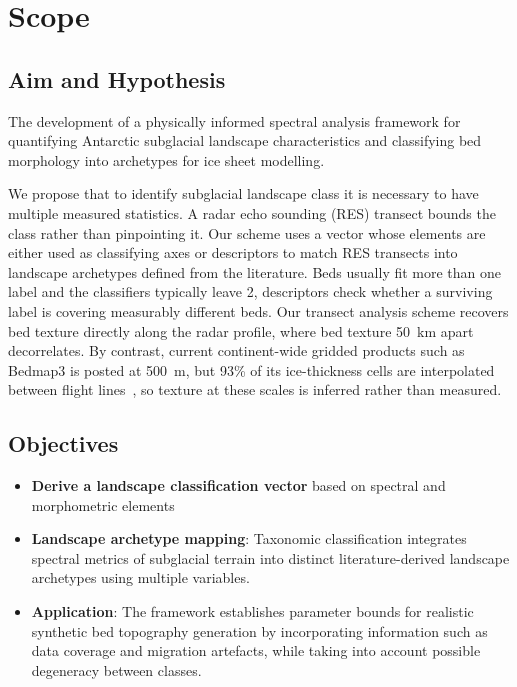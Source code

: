 \chapter{Scope}
\section{Aim and Hypothesis}
The development of a physically informed spectral analysis framework for quantifying Antarctic subglacial landscape characteristics and classifying bed morphology into archetypes for ice sheet modelling.

We propose that to identify subglacial landscape class it is necessary to have multiple measured statistics. A radar echo sounding (RES) transect bounds the class rather than pinpointing it. Our scheme uses a vector whose elements are either used as classifying axes or descriptors to match RES transects into landscape archetypes defined from the literature. Beds usually fit more than one label and the classifiers typically leave 2, descriptors check whether a surviving label is covering measurably different beds. Our transect analysis scheme recovers bed texture directly along the radar profile, where bed texture 50~km apart decorrelates. By contrast, current continent-wide gridded products such as Bedmap3 is posted at 500~m, but 93\% of its ice-thickness cells are interpolated between flight lines~\cite{Pritchard_2025}, so texture at these scales is inferred rather than measured.

\section{Objectives}
\begin{itemize}
    \item{\textbf{Derive a landscape classification vector}} based on spectral and morphometric elements 
    \item{\textbf{Landscape archetype mapping}: Taxonomic classification integrates spectral metrics of subglacial terrain into distinct literature-derived landscape archetypes using multiple variables.}
    \item{\textbf{Application}: The framework establishes parameter bounds for realistic synthetic bed topography generation by incorporating information such as data coverage and migration artefacts, while taking into account possible degeneracy between classes.}
\end{itemize}
